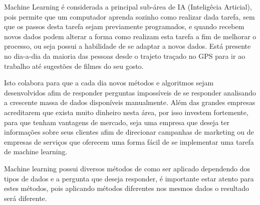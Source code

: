 Machine Learning é considerada a principal sub-área de IA (Inteligêcia Articial), pois permite
que um computador aprenda sozinho como realizar dada tarefa, sem que os passos desta tarefa sejam previamente programados, e
quando recebem novos dados podem alterar a forma como realizam esta tarefa a fim de melhorar o processo, ou seja possui a 
habilidade de se adaptar a novos dados. Está presente no dia-a-dia da maioria das pessoas desde o trajeto traçado no GPS
para ir ao trabalho até sugestões de filmes do seu gosto.  


Isto colabora para que a cada dia novos métodos e algoritmos sejam desenvolvidos afim de responder perguntas impossíveis de se responder
analisando a crescente massa de dados disponíveis manualmente. Além das grandes empresas acreditarem que exista muito dinheiro nesta área,
por isso investem fortemente, para que tenham vantagens de mercado, seja uma empresa que deseja ter informações sobre
seus clientes afim de direcionar campanhas de marketing ou de empresas de serviços que oferecem uma forma fácil de se implementar
uma tarefa de machine learning.

Machine learning possui diversos métodos de como ser aplicado dependendo dos tipos de dados e a pergunta que deseja responder, 
é importante estar atento para estes métodos, pois aplicando métodos diferentes nos mesmos dados o resultado será diferente.

